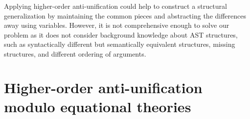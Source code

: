 Applying higher-order anti-unification could help to construct a structural generalization by maintaining the common pieces and abstracting the differences away using variables. However, it is not comprehensive enough to solve our problem as it does not consider background knowledge about AST structures, such as syntactically different but semantically equivalent structures, missing structures, and different ordering of arguments.

\section{Higher-order anti-unification modulo equational theories}\label{HOAUMT}

